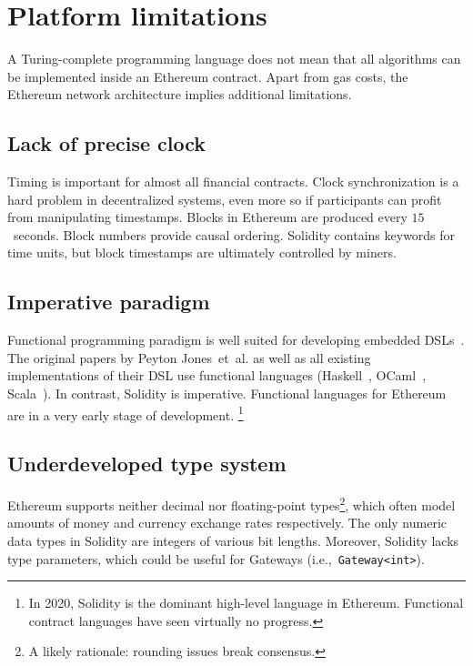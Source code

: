 \section{Platform limitations}

A Turing-complete programming language does not mean that all algorithms can be implemented inside an Ethereum contract.
Apart from gas costs, the Ethereum network architecture implies additional limitations.

\subsection{Lack of precise clock}
Timing is important for almost all financial contracts.
Clock synchronization is a hard problem in decentralized systems, even more so if participants can profit from manipulating timestamps.
Blocks in Ethereum are produced every $15$~seconds.
Block numbers provide causal ordering.
Solidity contains keywords for time units, but block timestamps are ultimately controlled by miners.

\subsection{Imperative paradigm}
Functional programming paradigm is well suited for developing embedded DSLs~\cite{Gibbons2015}.
The original papers by Peyton Jones~et~al. as well as all existing implementations of their DSL use functional languages (Haskell~\cite{PeytonJones2000, Jones2003, Straaten2007}, OCaml~\cite{LexiFi}, Scala~\cite{Walton2012, Chaudhary2015}).
In contrast, Solidity is imperative.
Functional languages for Ethereum~\cite{FpEthereum2017} are in a very early stage of development.
\footnote{In 2020, Solidity is the dominant high-level language in Ethereum. Functional contract languages have seen virtually no progress.}

\subsection{Underdeveloped type system}
Ethereum supports neither decimal nor floating-point types\footnote{A likely rationale: rounding issues break consensus.}, which often model amounts of money and currency exchange rates respectively.
The only numeric data types in Solidity are integers of various bit lengths.
Moreover, Solidity lacks type parameters, which could be useful for Gateways (i.e.,~\texttt{Gateway<int>}).



